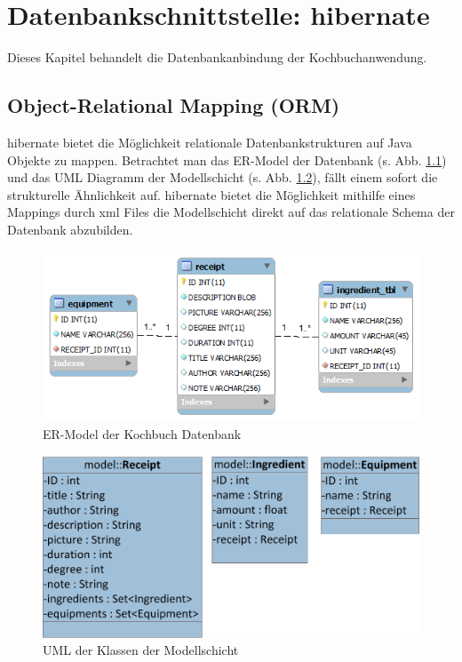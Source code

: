 \chapter{Datenbankschnittstelle: \gls{hibernate}}
Dieses Kapitel behandelt die Datenbankanbindung der Kochbuchanwendung.
\section{Object-Relational Mapping (ORM)}
\gls{hibernate} bietet die Möglichkeit relationale Datenbankstrukturen auf Java Objekte zu mappen. Betrachtet man das ER-Model der Datenbank (s. Abb. \ref{hib_erm}) und das UML Diagramm der Modellschicht (s. Abb. \ref{hib_uml}), fällt einem sofort die strukturelle Ähnlichkeit auf. \gls{hibernate} bietet die Möglichkeit mithilfe eines Mappings durch \acrshort{xml} Files die Modellschicht direkt auf das relationale Schema der Datenbank abzubilden.
\begin{figure}[htbp]
    \centering
    \includegraphics[scale=0.7]{images/relational-model.png}
    \caption{ER-Model der Kochbuch Datenbank}
    \label{hib_erm}
\end{figure}
\begin{figure}[htbp]
    \centering
    \includegraphics[scale=3.5]{images/model-uml.png}
    \caption{UML der Klassen der Modellschicht}
    \label{hib_uml}
\end{figure}

